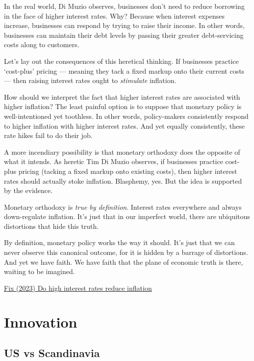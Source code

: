 \documentclass[
]{book}
\begin{document}
In the real world, Di Muzio observes, businesses don't need to reduce borrowing in the face of higher interest rates. Why? Because when interest expenses increase, businesses can respond by trying to raise their income. In other words, businesses can maintain their debt levels by passing their greater debt-servicing costs along to customers.

Let's lay out the consequences of this heretical thinking. If businesses practice `cost-plus' pricing --- meaning they tack a fixed markup onto their current costs --- then raising interest rates ought to \emph{stimulate} inflation.

How should we interpret the fact that higher interest rates are associated with higher inflation? The least painful option is to suppose that monetary policy is well-intentioned yet toothless. In other words, policy-makers consistently respond to higher inflation with higher interest rates. And yet equally consistently, these rate hikes fail to do their job.

A more incendiary possibility is that monetary orthodoxy does the opposite of what it intends. As heretic Tim Di Muzio observes, if businesses practice cost-plus pricing (tacking a fixed markup onto existing costs), then higher interest rates should actually stoke inflation. Blasphemy, yes. But the idea is supported by the evidence.

Monetary orthodoxy is \emph{true by definition}. Interest rates everywhere and always down-regulate inflation. It's just that in our imperfect world, there are ubiquitous distortions that hide this truth.

By definition, monetary policy works the way it should. It's just that we can never observe this canonical outcome, for it is hidden by a barrage of distortions. And yet we have faith. We have faith that the plane of economic truth is there, waiting to be imagined.

\href{https://economicsfromthetopdown.com/2023/02/04/do-high-interest-rates-reduce-inflation-a-test-of-monetary-faith/}{Fix (2023) Do high interest rates reduce inflation}

\hypertarget{innovation}{%
\chapter{Innovation}\label{innovation}}

\hypertarget{us-vs-scandinavia}{%
\section{US vs Scandinavia}\label{us-vs-scandinavia}}
\end{document}
